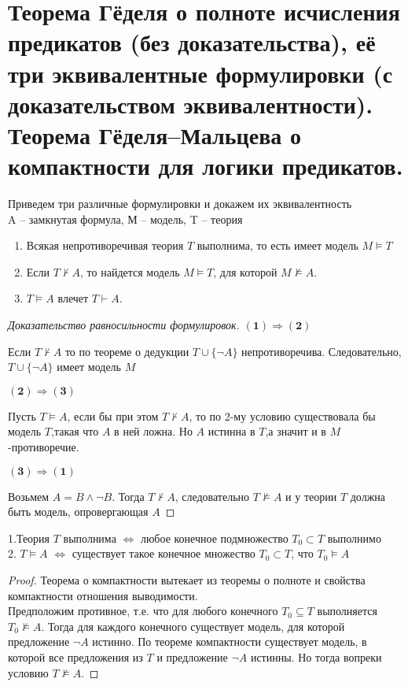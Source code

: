 \section{\texorpdfstring{Теорема Гёделя о полноте исчисления предикатов (без доказательства), её
три эквивалентные формулировки (с доказательством эквивалентности).\\
Теорема Гёделя–Мальцева о компактности для логики предикатов.}{Теорема Гёделя о полноте исчисления предикатов. Три
эквивалентные формулировки. Теорема Гёделя-Мальцева о компактности для логики предикатов}}
\begin{theorem}
    Приведем три различные формулировки и докажем их эквивалентность\\
    A -- замкнутая формула, М -- модель, T -- теория
	\begin{enumerate}
		\item Всякая непротиворечивая теория $T$ выполнима, то есть имеет модель $M\models T$
		\item Если $ T \nvdash A$, то найдется модель $M\models T$, для которой $M \nvDash A$.
		\item $T\models A$ влечет $T \vdash A$.
	\end{enumerate}
\end{theorem}
\begin{proof}[Доказательство равносильности формулировок]
    $\boldsymbol{(1)}\Rightarrow \boldsymbol{(2)}$
    
	Если $T\nvdash A$ то по теореме о дедукции ${T} \cup \{\neg A\}$ непротиворечива.
    Следовательно, \\$T \cup \{\neg A\}$ имеет модель $M$
    
    $\boldsymbol{(2)}\Rightarrow \boldsymbol{(3)}$

	Пусть $T\vDash A$, если бы при этом $T \nvdash A$, то по 2-му условию существовала
	бы модель $T$,такая что $A$ в ней ложна. Но $A$ истинна в $T$,а значит и в $M$-противоречие.

    $\boldsymbol{(3)}\Rightarrow \boldsymbol{(1)}$

	Возьмем $A = B \wedge \neg B$. Тогда $T\nvdash A$, следовательно $T \nvDash A$ и у теории $T$ должна быть
	модель, опровергающая $A$
\end{proof}
\begin{theorem}
	1.Теория $T$ выполнима $ \Longleftrightarrow$ любое конечное подмножество
	$T_0\subset T$ выполнимо\\
	2. $T\models A$   $ \Longleftrightarrow$ существует такое конечное множество
	$T_0\subset T$, что $T_0\models A$  
\end{theorem}
\begin{proof}
Теорема о компактности вытекает из теоремы о полноте и свойства компактности отношения выводимости.\\
Предположим противное, т.е. что для любого конечного $T_0\subseteq T$ выполняется
$T_0\nvDash A$. Тогда для каждого конечного существует модель, для которой предложение
$\neg A$  истинно. По теореме компактности существует модель, в которой все предложения из
$T$ и предложение $\neg A$ истинны. Но тогда вопреки условию $T\nvDash A$.
\end{proof}
